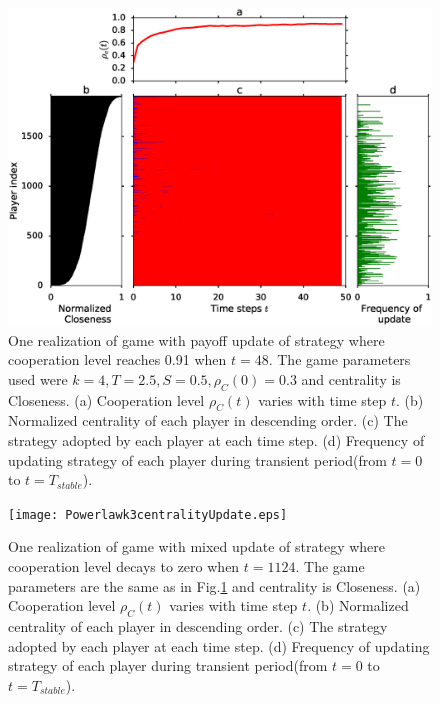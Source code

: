 \documentclass[preprint,12pt,3p]{elsarticle}
\begin{document}
\begin{figure}[htbp]
\centering
\includegraphics[width=13cm]{Powerlawk3PayoffUpdate.eps}
\caption{One realization of game with payoff update of strategy where cooperation level reaches
0.91 when $t=48$.
The game parameters used were $k=4,T=2.5,S=0.5,\rho_{C}(0)=0.3$ and centrality is Closeness.
(a) Cooperation level $\rho_{C}(t)$ varies with time step $t$.
(b) Normalized centrality of each player in descending order.
(c) The strategy adopted by each player at each time step.
(d) Frequency of updating strategy of each player during transient period(from $t=0$ to $t=T_{stable}$). }
\label{payoffUpdateProcess}
\end{figure}


\begin{figure}[htbp]
\centering
\texttt{[image: Powerlawk3centralityUpdate.eps]}
\caption{One realization of game with mixed update of strategy where cooperation level decays
to zero when $t=1124$.
The game parameters are the same as in Fig.\ref{payoffUpdateProcess} and centrality is Closeness.
(a) Cooperation level $\rho_{C}(t)$ varies with time step $t$.
(b) Normalized centrality of each player in descending order.
(c) The strategy adopted by each player at each time step.
(d) Frequency of updating strategy of each player during transient period(from $t=0$ to $t=T_{stable}$). }
\label{centralityUpdateProcess}
\end{figure}
\end{document}
